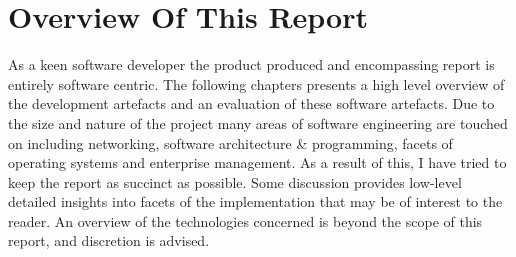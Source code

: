 \section{Overview Of This Report}

	\normalsize
	{
		As a keen software developer the product produced and encompassing report is entirely software centric.
		The following chapters presents a high level overview of the development artefacts and an evaluation 
		of these software artefacts.  Due to the size and nature of the project many areas of software engineering are touched on
		including networking, software architecture \& programming, facets of operating systems and enterprise management.
		As a result of this, I have tried to keep the report as succinct as possible. 
		\newline
		\newline
		Some discussion provides low-level detailed insights into facets of the implementation that may be of interest to the reader. 
		An overview of the technologies concerned is beyond the scope of this report, and discretion is advised.
		\newline
		
	}